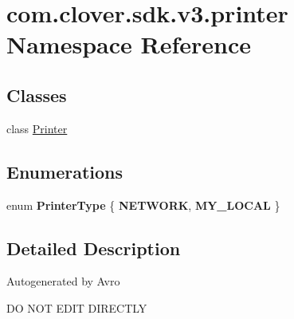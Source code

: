\hypertarget{namespacecom_1_1clover_1_1sdk_1_1v3_1_1printer}{}\section{com.\+clover.\+sdk.\+v3.\+printer Namespace Reference}
\label{namespacecom_1_1clover_1_1sdk_1_1v3_1_1printer}
\subsection*{Classes}
\begin{DoxyCompactItemize}
\item 
class \hyperlink{classcom_1_1clover_1_1sdk_1_1v3_1_1printer_1_1_printer}{Printer}
\end{DoxyCompactItemize}
\subsection*{Enumerations}
\begin{DoxyCompactItemize}
\item 
\mbox{\label{namespacecom_1_1clover_1_1sdk_1_1v3_1_1printer_aaa495f52394f8a733ba9bb4650cb1583}} 
enum {\bfseries Printer\+Type} \{ {\bfseries N\+E\+T\+W\+O\+RK}, 
{\bfseries M\+Y\+\_\+\+L\+O\+C\+AL}
 \}
\end{DoxyCompactItemize}


\subsection{Detailed Description}
Autogenerated by Avro

DO N\+OT E\+D\+IT D\+I\+R\+E\+C\+T\+LY 